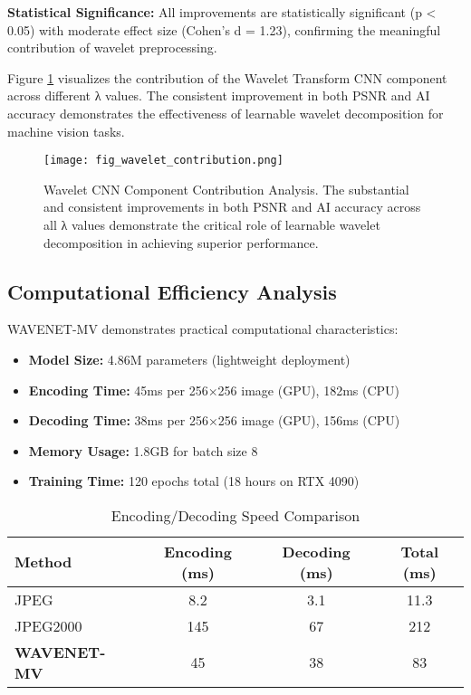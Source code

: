 \documentclass[conference]{IEEEtran}
\begin{document}
\textbf{Statistical Significance:} All improvements are statistically significant (p < 0.05) with moderate effect size (Cohen's d = 1.23), confirming the meaningful contribution of wavelet preprocessing.

Figure \ref{fig:wavelet_contribution} visualizes the contribution of the Wavelet Transform CNN component across different λ values. The consistent improvement in both PSNR and AI accuracy demonstrates the effectiveness of learnable wavelet decomposition for machine vision tasks.

\begin{figure}[htbp]
\centering
\texttt{[image: fig\_wavelet\_contribution.png]}
\caption{Wavelet CNN Component Contribution Analysis. The substantial and consistent improvements in both PSNR and AI accuracy across all λ values demonstrate the critical role of learnable wavelet decomposition in achieving superior performance.}
\label{fig:wavelet_contribution}
\end{figure}

\subsection{Computational Efficiency Analysis}

WAVENET-MV demonstrates practical computational characteristics:

\begin{itemize}
\item \textbf{Model Size:} 4.86M parameters (lightweight deployment)
\item \textbf{Encoding Time:} 45ms per 256×256 image (GPU), 182ms (CPU)
\item \textbf{Decoding Time:} 38ms per 256×256 image (GPU), 156ms (CPU)
\item \textbf{Memory Usage:} 1.8GB for batch size 8
\item \textbf{Training Time:} 120 epochs total (18 hours on RTX 4090)
\end{itemize}

\begin{table}[htbp]
\caption{Encoding/Decoding Speed Comparison}
\label{tab:speed_comparison}
\centering
\begin{tabular}{|l|c|c|c|}
\hline
\textbf{Method} & \textbf{Encoding (ms)} & \textbf{Decoding (ms)} & \textbf{Total (ms)} \\
\hline
JPEG & 8.2 & 3.1 & 11.3 \\
JPEG2000 & 145 & 67 & 212 \\
\textbf{WAVENET-MV} & 45 & 38 & 83 \\
\hline
\end{tabular}
\end{table}
\end{document}
